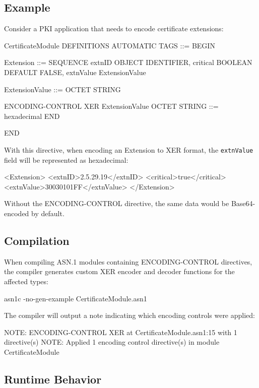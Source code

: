 \documentclass[english,oneside,12pt]{book}
\begin{document}
\subsection*{Example}

Consider a PKI application that needs to encode certificate extensions:

\begin{asn}
CertificateModule DEFINITIONS AUTOMATIC TAGS ::= BEGIN

Extension ::= SEQUENCE {
    extnID      OBJECT IDENTIFIER,
    critical    BOOLEAN DEFAULT FALSE,
    extnValue   ExtensionValue
}

ExtensionValue ::= OCTET STRING

ENCODING-CONTROL XER
    ExtensionValue OCTET STRING ::= hexadecimal
END

END
\end{asn}

With this directive, when encoding an Extension to XER format, the \texttt{extnValue} 
field will be represented as hexadecimal:

\begin{example}
<Extension>
    <extnID>2.5.29.19</extnID>
    <critical>true</critical>
    <extnValue>30030101FF</extnValue>
</Extension>
\end{example}

Without the ENCODING-CONTROL directive, the same data would be Base64-encoded by default.

\subsection*{Compilation}

When compiling ASN.1 modules containing ENCODING-CONTROL directives, the compiler 
generates custom XER encoder and decoder functions for the affected types:

\begin{bash}
asn1c -no-gen-example CertificateModule.asn1
\end{bash}

The compiler will output a note indicating which encoding controls were applied:

\begin{bash}
NOTE: ENCODING-CONTROL XER at CertificateModule.asn1:15 with 1 directive(s)
NOTE: Applied 1 encoding control directive(s) in module CertificateModule
\end{bash}

\subsection*{Runtime Behavior}
\end{document}
